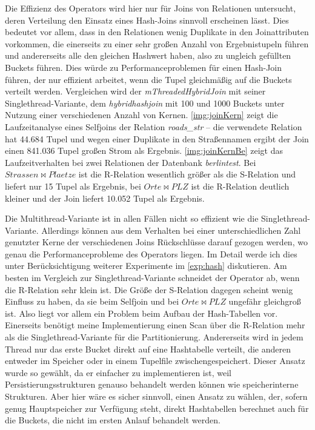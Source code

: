 \documentclass[a4paper,12pt,twoside]{article}
\newcommand{\Fb}[1]{\textit{#1}} %
\begin{document}
Die Effizienz des Operators wird hier nur für Joins von Relationen untersucht, deren Verteilung den Einsatz eines Hash-Joins sinnvoll erscheinen lässt. Dies bedeutet vor allem, dass in den Relationen wenig Duplikate in den Joinattributen vorkommen, die einerseits zu einer sehr großen Anzahl von Ergebnistupeln führen und andererseits alle den gleichen Hashwert haben, also zu ungleich gefüllten Buckets führen. Dies würde zu Performanceproblemen für einen Hash-Join führen, der nur effizient arbeitet, wenn die Tupel gleichmäßig auf die Buckets verteilt werden. Vergleichen wird der \Fb{mThreadedHybridJoin} mit seiner Singlethread-Variante, dem \Fb{hybridhashjoin} mit 100 und 1000 Buckets unter Nutzung einer verschiedenen Anzahl von Kernen. \autoref{img:joinKern} zeigt die Laufzeitanalyse eines Selfjoins der Relation \Fb{roads\_str} -- die verwendete Relation hat 44.684 Tupel und wegen einer Duplikate in den Straßennamen ergibt der Join einen 841.036 Tupel großen Strom als Ergebnis. \autoref{img:joinKernBe} zeigt das Laufzeitverhalten bei zwei Relationen der Datenbank \Fb{berlintest}. Bei $Strassen \bowtie Plaetze$ ist die R-Relation wesentlich größer als die S-Relation und liefert nur 15 Tupel als Ergebnis, bei $Orte \bowtie PLZ$ ist die R-Relation deutlich kleiner und der Join liefert 10.052 Tupel als Ergebnis.

Die Multithread-Variante ist in allen Fällen nicht so effizient wie die Singlethread-Variante. Allerdings können aus dem Verhalten bei einer unterschiedlichen Zahl genutzter Kerne der verschiedenen Joins Rückschlüsse darauf gezogen werden, wo genau die Performanceprobleme des Operators liegen. Im Detail werde ich dies unter Berücksichtigung weiterer Experimente im \autoref{exp:hash} diskutieren. Am besten im Vergleich zur Singlethread-Variante schneidet der Operator ab, wenn die R-Relation sehr klein ist. Die Größe der S-Relation dagegen scheint wenig Einfluss zu haben, da sie beim Selfjoin und bei $Orte \bowtie PLZ$ ungefähr gleichgroß ist. Also liegt vor allem ein Problem beim Aufbau der Hash-Tabellen vor. Einerseits benötigt meine Implementierung einen Scan über die R-Relation mehr als die Singlethread-Variante für die Partitionierung. Andererseits wird in jedem Thread nur das erste Bucket direkt auf eine Hashtabelle verteilt, die anderen entweder im Speicher oder in einem Tupelfile zwischengespeichert. Dieser Ansatz wurde so gewählt, da er einfacher zu implementieren ist, weil Persistierungsstrukturen genauso behandelt werden können wie speicherinterne Strukturen. Aber hier wäre es sicher sinnvoll, einen Ansatz zu wählen, der, sofern genug Hauptspeicher zur Verfügung steht, direkt Hashtabellen berechnet auch für die Buckets, die nicht im ersten Anlauf behandelt werden. 
\end{document}
